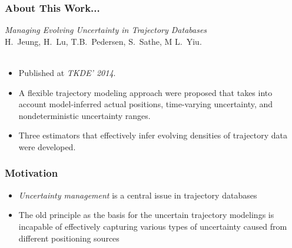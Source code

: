 \begin{frame}
\frametitle{About This Work...}

\emph{Managing Evolving Uncertainty in Trajectory Databases}~\cite{jeung2014managing}\\
H.~Jeung, H.~Lu, T.B.~Pedersen, S.~Sathe, M L.~Yiu.\\~\\

\begin{itemize}
  \item Published at \emph{TKDE' 2014}.
  \item A flexible trajectory modeling approach were proposed that takes into account model-inferred actual positions, time-varying uncertainty, and nondeterministic uncertainty ranges.
  \item Three estimators that effectively infer evolving densities of trajectory data were developed.
\end{itemize}

\end{frame}


\begin{frame}
\frametitle{Motivation}

\begin{itemize}
  \item \emph{Uncertainty management} is a central issue in trajectory databases
  \item The old principle as the basis for the uncertain trajectory modelings is incapable of effectively capturing various types of uncertainty caused from different positioning sources
\end{itemize}

\end{frame}

